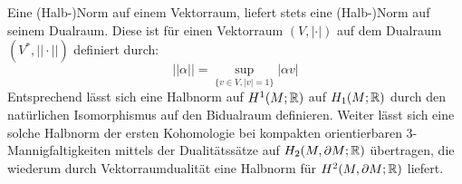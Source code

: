     \begin{bem}
        Eine (Halb-)Norm auf einem Vektorraum, liefert stets eine (Halb-)Norm auf seinem Dualraum. Diese ist für einen Vektorraum $(V,|\cdot|)$ auf dem Dualraum $(V^*,||\cdot||)$ definiert durch:
        \[
             ||\alpha||= \sup_{\{v\in V, |v|=1\}} |\alpha v|
         \] 
         Entsprechend lässt sich eine Halbnorm auf $H^1(M;\mathbb{R})$ auf $H_1(M;\mathbb{R})$ durch den natürlichen Isomorphismus auf den Bidualraum definieren. Weiter lässt sich eine solche Halbnorm der ersten Kohomologie bei kompakten orientierbaren 3-Mannigfaltigkeiten mittels der Dualitätssätze auf $H_2(M,\partial M;\mathbb{R})$ übertragen, die wiederum durch Vektorraumdualität eine Halbnorm für $H^2(M,\partial M;\mathbb{R})$ liefert.
    \end{bem}